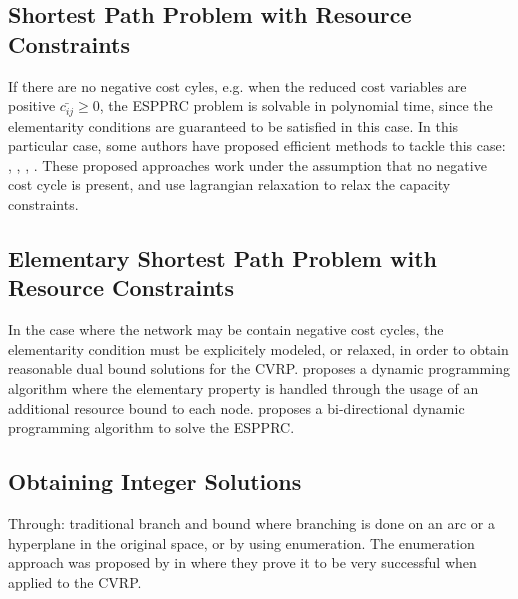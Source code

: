 \subsection{Shortest Path Problem with Resource Constraints}
If there are no negative cost cyles, e.g. when the reduced cost variables are positive $\bar{c_{ij}} \ge 0$,
the ESPPRC problem is solvable in polynomial time, since the elementarity conditions are guaranteed
to be satisfied in this case.
In this particular case, some authors have proposed efficient methods to tackle this case:
\cite{beasley1989}, \cite{carlyle2008}, \cite{dumitrescu2003}, \cite{muhandiramge2009}.
These proposed approaches work under the assumption that no negative cost cycle is present,
and use lagrangian relaxation to relax the capacity constraints.


\subsection{Elementary Shortest Path Problem with Resource Constraints}
In the case where the network may be contain negative cost cycles, the
elementarity condition must be explicitely modeled, or relaxed, in order
to obtain reasonable dual bound solutions for the CVRP.
\textcite{feillet2004} proposes a dynamic programming algorithm where
the elementary property is handled through the usage of an additional resource
bound to each node.
\textcite{righini2006} proposes a bi-directional dynamic programming algorithm to solve the ESPPRC.


\subsection{Obtaining Integer Solutions}

Through: traditional branch and bound where branching is done on an arc or a hyperplane in the original space, or by using enumeration.
The enumeration approach was proposed by \textcite{baldacci2008} in where they prove it to be very successful when applied to the CVRP.


\begin{comment}
\cite{jepsen2011}
The other method is enumeration which has proven to be very successful
for both cvrp[1] and vrptw[3]. In enumeration an upper bound U B and
a lower bound LB are used. From reduced cost fixing of a binary variable
it is know that any non basic column with a reduced cost strictly greater
than the gap ub − lb can not be part of an integer solution which is an
improvement of the current solution. This complete set of columns can be
found by solving an espprc using the dominance rule in proposition 5 and
bounding functions. Once we have added the columns with reduced cost less
than or equal to the gap the resulting problem can be solved as an integer
optimization problem.
\end{comment}

